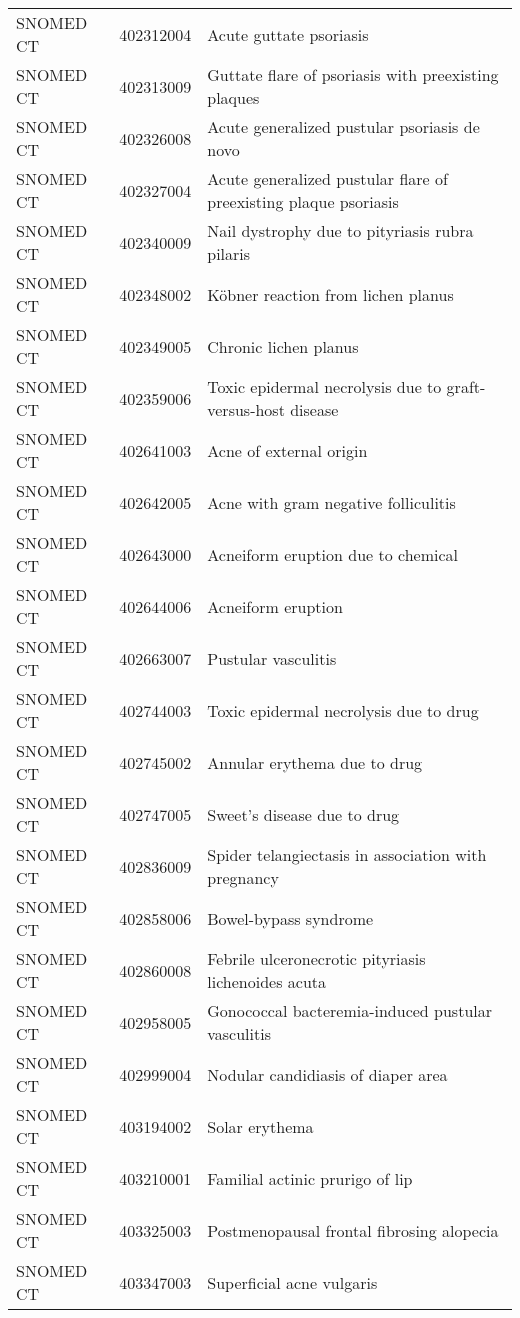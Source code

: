 \begin{longtable}{p{}p{}p{}}
  SNOMED CT & 402312004 & Acute guttate psoriasis \\ 
  SNOMED CT & 402313009 & Guttate flare of psoriasis with preexisting plaques \\ 
  SNOMED CT & 402326008 & Acute generalized pustular psoriasis de novo \\ 
  SNOMED CT & 402327004 & Acute generalized pustular flare of preexisting plaque psoriasis \\ 
  SNOMED CT & 402340009 & Nail dystrophy due to pityriasis rubra pilaris \\ 
  SNOMED CT & 402348002 & Köbner reaction from lichen planus \\ 
  SNOMED CT & 402349005 & Chronic lichen planus \\ 
  SNOMED CT & 402359006 & Toxic epidermal necrolysis due to graft-versus-host disease \\ 
  SNOMED CT & 402641003 & Acne of external origin \\ 
  SNOMED CT & 402642005 & Acne with gram negative folliculitis \\ 
  SNOMED CT & 402643000 & Acneiform eruption due to chemical \\ 
  SNOMED CT & 402644006 & Acneiform eruption \\ 
  SNOMED CT & 402663007 & Pustular vasculitis \\ 
  SNOMED CT & 402744003 & Toxic epidermal necrolysis due to drug \\ 
  SNOMED CT & 402745002 & Annular erythema due to drug \\ 
  SNOMED CT & 402747005 & Sweet's disease due to drug \\ 
  SNOMED CT & 402836009 & Spider telangiectasis in association with pregnancy \\ 
  SNOMED CT & 402858006 & Bowel-bypass syndrome \\ 
  SNOMED CT & 402860008 & Febrile ulceronecrotic pityriasis lichenoides acuta \\ 
  SNOMED CT & 402958005 & Gonococcal bacteremia-induced pustular vasculitis \\ 
  SNOMED CT & 402999004 & Nodular candidiasis of diaper area \\ 
  SNOMED CT & 403194002 & Solar erythema \\ 
  SNOMED CT & 403210001 & Familial actinic prurigo of lip \\ 
  SNOMED CT & 403325003 & Postmenopausal frontal fibrosing alopecia \\ 
  SNOMED CT & 403347003 & Superficial acne vulgaris \\ 

\end{longtable}
